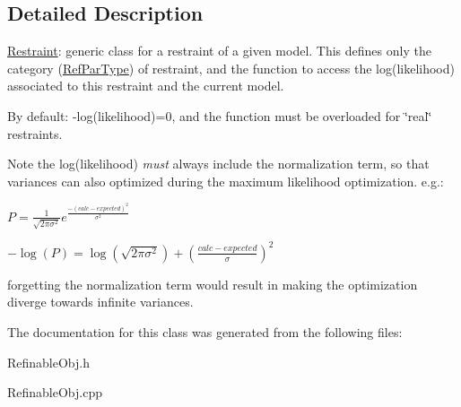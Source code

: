 \subsection{Detailed Description}
\mbox{\hyperlink{class_obj_cryst_1_1_restraint}{Restraint}}\+: generic class for a restraint of a given model. This defines only the category (\mbox{\hyperlink{class_obj_cryst_1_1_ref_par_type}{Ref\+Par\+Type}}) of restraint, and the function to access the log(likelihood) associated to this restraint and the current model.

By default\+: -\/log(likelihood)=0, and the function must be overloaded for \char`\"{}real\char`\"{} restraints.

\begin{DoxyNote}{Note}
the log(likelihood) {\itshape must} always include the normalization term, so that variances can also optimized during the maximum likelihood optimization. e.\+g.\+:
\begin{DoxyItemize}
\item $ P=\frac{1}{\sqrt{2\pi\sigma^2}}e^{\frac{-(calc-expected)^2}{\sigma^2}}$
\item $ -\log(P)= \log\left(\sqrt{2\pi\sigma^2}\right) + \left(\frac{calc-expected}{\sigma} \right)^2$
\end{DoxyItemize}
\end{DoxyNote}
forgetting the normalization term would result in making the optimization diverge towards infinite variances. 

The documentation for this class was generated from the following files\+:\begin{DoxyCompactItemize}
\item 
Refinable\+Obj.\+h\item 
Refinable\+Obj.\+cpp\end{DoxyCompactItemize}
